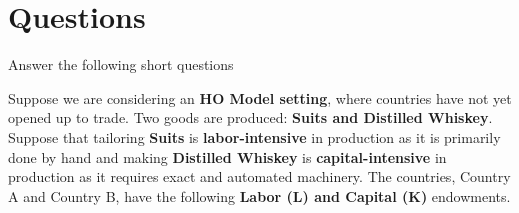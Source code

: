 \documentclass[12pt]{exam}
\begin{document}
\section*{Questions}
\begin{questions}

\question
Answer the following short questions


\newpage 

\question
Suppose we are considering an \textbf{HO Model setting}, where countries have not yet opened up to trade.
Two goods are produced: \textbf{Suits and Distilled Whiskey}. 
Suppose that tailoring \textbf{Suits} is \textbf{labor-intensive} in production as it is primarily done by hand and making \textbf{Distilled Whiskey} is \textbf{capital-intensive} in production as it requires exact and automated machinery. 
The countries, Country A and Country B, have the following \textbf{Labor (L) and Capital (K)} endowments.



\end{questions}
\end{document}
